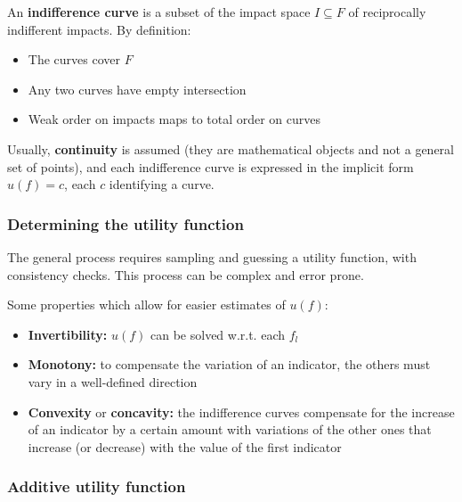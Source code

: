 An \textbf{indifference curve} is a subset of the impact space $I \subseteq F$ of reciprocally indifferent impacts. By definition: 
\begin{itemize}
	\item The curves cover $F$
	
	\item Any two curves have empty intersection
	
	\item Weak order on impacts maps to total order on curves
\end{itemize}

Usually, \textbf{continuity} is assumed (they are mathematical objects and not a general set of points), and each indifference curve is expressed in the implicit form $ u(f) = c$, each $c$ identifying a curve.


\subsubsection{Determining the utility function}

The general process requires sampling and guessing a utility function, with consistency checks. This process can be complex and error prone. 

Some properties which allow for easier estimates of $u(f)$: 
\begin{itemize}
	\item \textbf{Invertibility:} $u(f)$ can be solved w.r.t. each $f_l$
	
	\item \textbf{Monotony:} to compensate the variation of an indicator, the others must vary in a well-defined direction
	
	\item \textbf{Convexity} or \textbf{concavity:} the indifference curves compensate for the increase 	of an indicator by a certain amount with variations of the other ones that increase (or decrease) with the value of the first indicator
\end{itemize}

\subsubsection{Additive utility function}

